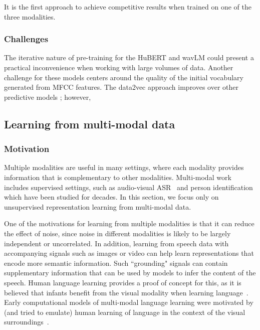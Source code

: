  It is the first approach to achieve competitive results when trained on  one of the three modalities. 

\subsubsection{Challenges}
The iterative nature of pre-training for the HuBERT and wavLM could present a practical inconvenience when working with large volumes of data. Another challenge for these models centers around the quality of the initial vocabulary generated from MFCC features. 
The data2vec approach improves over other predictive models ; however, 

\subsection{Learning from multi-modal data}
\subsubsection{Motivation}
Multiple modalities are useful in many settings, where each modality provides information that is complementary to other modalities.  Multi-modal work includes supervised settings, such as audio-visual ASR~\cite{petajan_automatic_1984,potamianos_recent_2003} and person identification~\cite{aleksic_audiovisual_2006} which have been studied for decades.  In this section, we focus only on unsupervised representation learning from multi-modal data.

One of the motivations for learning from multiple modalities is that it can reduce the effect of noise, since noise in different modalities is likely to be largely independent or uncorrelated.  In addition, learning from speech data with accompanying signals such as images or video can help learn representations that encode more semantic information. Such ``grounding" signals can contain supplementary information that can be used by models to infer the content of the speech. Human language learning provides a proof of concept for this, as it is believed that infants benefit from the visual modality when learning language~\cite{legerstee_infants_1990}. Early computational models of multi-modal language learning were motivated by (and tried to emulate) human learning of language in the context of the visual surroundings~\cite{roy_learning_1999}.


